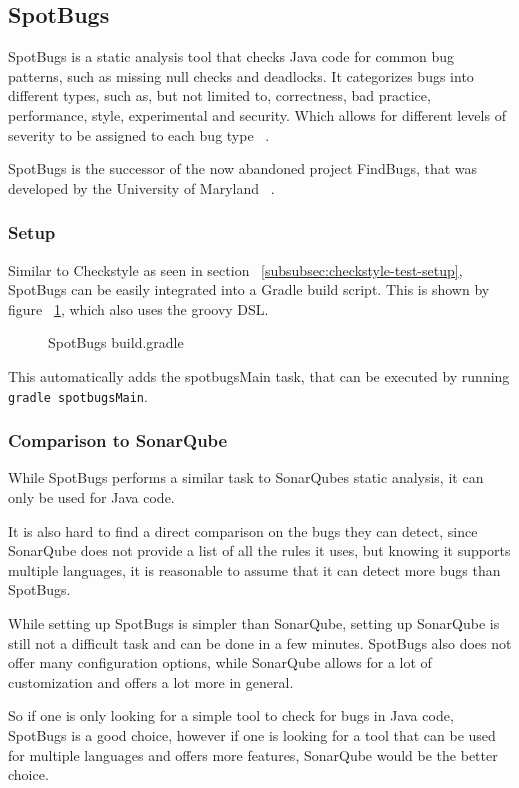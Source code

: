 \subsection{SpotBugs}\label{subsec:spotbugs}

SpotBugs is a static analysis tool that checks Java code for common bug patterns, such as missing null checks and deadlocks.
It categorizes bugs into different types, such as, but not limited to, correctness, bad practice, performance, style, experimental and security.
Which allows for different levels of severity to be assigned to each bug type ~\cite{spotbugs-docs}.

SpotBugs is the successor of the now abandoned project FindBugs, that was developed by the University of Maryland ~\cite{spotbugs-docs}.

\subsubsection{Setup}

Similar to Checkstyle as seen in section ~\ref{subsubsec:checkstyle-test-setup}, SpotBugs can be easily integrated into a Gradle build script.
This is shown by figure ~\ref{fig:spotbugs-gradle}, which also uses the groovy DSL.

\begin{figure}[h]
    \caption{SpotBugs build.gradle}
    
    \label{fig:spotbugs-gradle}
\end{figure}

This automatically adds the spotbugsMain task, that can be executed by running \texttt{gradle spotbugsMain}.

\subsubsection{Comparison to SonarQube}\label{subsubsec:spotbugs-comparison}

While SpotBugs performs a similar task to SonarQubes static analysis, it can only be used for Java code.

It is also hard to find a direct comparison on the bugs they can detect, since SonarQube does not provide a list of all the rules it uses,
but knowing it supports multiple languages, it is reasonable to assume that it can detect more bugs than SpotBugs.

While setting up SpotBugs is simpler than SonarQube, setting up SonarQube is still not a difficult task and can be done in a few minutes.
SpotBugs also does not offer many configuration options, while SonarQube allows for a lot of customization and offers a lot more in general.

So if one is only looking for a simple tool to check for bugs in Java code, SpotBugs is a good choice, however if one is looking for a tool that can be used for multiple languages and offers more features, SonarQube would be the better choice.